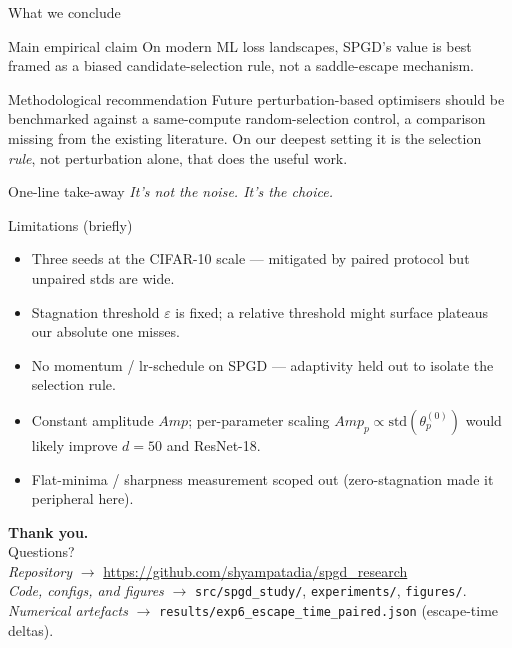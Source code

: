 \documentclass[11pt,aspectratio=169]{beamer}
\newcommand{\amp}{\ensuremath{\textit{Amp}}}
\begin{document}
\begin{frame}{What we conclude}
  \begin{block}{Main empirical claim}
    On modern ML loss landscapes, SPGD's value is best framed as a
    \alert{biased candidate-selection rule}, not a saddle-escape mechanism.
  \end{block}

  \vspace{0.4em}
  \begin{block}{Methodological recommendation}
    \alert{Future perturbation-based optimisers should be benchmarked
    against a same-compute random-selection control}, a comparison
    missing from the existing literature. On our deepest setting it is
    the selection \emph{rule}, not perturbation alone, that does the
    useful work.
  \end{block}

  \vspace{0.4em}
  \begin{block}{One-line take-away}
    \centering
    \emph{It's not the noise. It's the choice.}
  \end{block}
\end{frame}

\begin{frame}{Limitations (briefly)}
  \footnotesize
  \begin{itemize}\setlength\itemsep{0.3em}
    \item Three seeds at the CIFAR-10 scale --- mitigated by paired protocol
          but unpaired stds are wide.
    \item Stagnation threshold $\varepsilon$ is fixed; a relative threshold
          might surface plateaus our absolute one misses.
    \item No momentum / lr-schedule on SPGD --- adaptivity held out to
          isolate the selection rule.
    \item Constant amplitude \amp{}; per-parameter scaling
          $\amp_p \propto \mathrm{std}(\theta_p^{(0)})$ would likely improve
          $d{=}50$ and ResNet-18.
    \item Flat-minima / sharpness measurement scoped out (zero-stagnation
          made it peripheral here).
  \end{itemize}
\end{frame}

\begin{frame}[plain]
  \centering
  \vspace{1.5em}
  {\Huge\bfseries\color{slateblue} Thank you.}\\[1.5em]
  {\Large Questions?}\\[2em]
  {\small
   \emph{Repository} \quad\(\rightarrow\)\quad
   \url{https://github.com/shyampatadia/spgd_research}\\[0.4em]
   \emph{Code, configs, and figures} \quad\(\rightarrow\)\quad
   \texttt{src/spgd\_study/}, \texttt{experiments/}, \texttt{figures/}.\\[0.3em]
   \emph{Numerical artefacts} \quad\(\rightarrow\)\quad
   \texttt{results/exp6\_escape\_time\_paired.json} (escape-time deltas).
  }
\end{frame}
\end{document}

